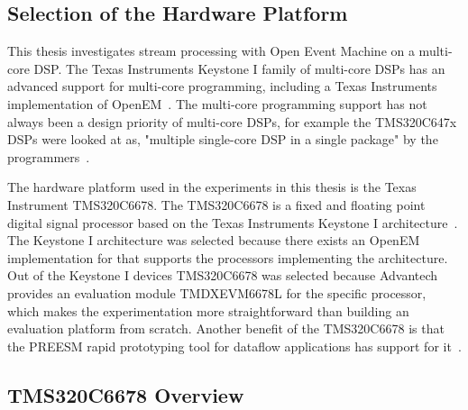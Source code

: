 \subsection{Selection of the Hardware Platform}
\label{subsec:selection-of-platform}
This thesis investigates stream processing with Open Event Machine on a multi-core DSP. The Texas Instruments Keystone I family of multi-core DSPs has an advanced support for multi-core programming, including a Texas Instruments implementation of OpenEM~\cite{MCSDKbrochure}. The multi-core programming support has not always been a design priority of multi-core DSPs, for example the TMS320C647x DSPs were looked at as, "multiple single-core DSP in a single package" by the programmers~\cite{moerman2014open}.

The hardware platform used in the experiments in this thesis is the Texas Instrument TMS320C6678. The TMS320C6678 is a fixed and floating point digital signal processor based on the Texas Instruments Keystone I architecture~\cite{tmsdatasheet}. The Keystone I architecture was selected because there exists an OpenEM implementation for that supports the processors implementing the architecture. Out of the Keystone I devices TMS320C6678 was selected because Advantech provides an evaluation module TMDXEVM6678L for the specific processor, which makes the experimentation more straightforward than building an evaluation platform from scratch. Another benefit of the TMS320C6678 is that the PREESM rapid prototyping tool for dataflow applications has support for it~\cite{pelcat2014preesm}.

\subsection{TMS320C6678 Overview}
\label{subsec:hw-overview}

